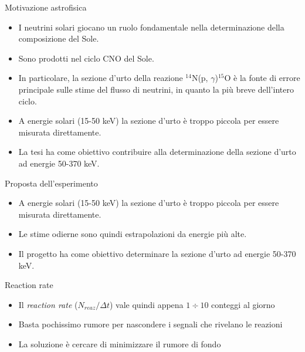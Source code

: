 \documentclass [xcolor=svgnames, 9pt] {beamer}
\begin{document}
\begin{frame}[noframenumbering]{Motivazione astrofisica}
	\begin{itemize}
		\item<1-> I neutrini solari giocano un ruolo fondamentale nella determinazione della composizione del Sole.
		\item<2-> Sono prodotti nel ciclo CNO del Sole.
		\item<3-> In particolare, la sezione d'urto della reazione $^{14}$N(p, $\gamma$)$^{15}$O è la fonte di errore principale sulle stime del flusso di neutrini, in quanto la più breve dell'intero ciclo.
		\item<4-> A energie solari (15-50 keV) la sezione d'urto è troppo piccola per essere misurata direttamente.
		\item<5-> La tesi ha come obiettivo contribuire alla determinazione della sezione d'urto ad energie 50-370 keV.
	\end{itemize}
\end{frame}
\begin{frame}[noframenumbering]{Proposta dell'esperimento}
	\begin{itemize}
		\item<1-> A energie solari (15-50 keV) la sezione d'urto è troppo piccola per essere misurata direttamente.
		\item<2-> Le stime odierne sono quindi estrapolazioni da energie più alte.
		\item<3-> Il progetto ha come obiettivo determinare la sezione d'urto ad energie 50-370 keV.
	\end{itemize}
\end{frame}

\begin{frame}[noframenumbering]{Reaction rate}
	\begin{itemize}
			\item<1-> Il \emph{reaction rate} ($N_{reaz}/\Delta t$) vale quindi appena $1\div 10$ conteggi al giorno
			\item<2-> Basta pochissimo rumore per nascondere i segnali che rivelano le reazioni
			\item<3-> La soluzione è cercare di minimizzare il rumore di fondo 
		\end{itemize}
\end{frame}
\end{document}
